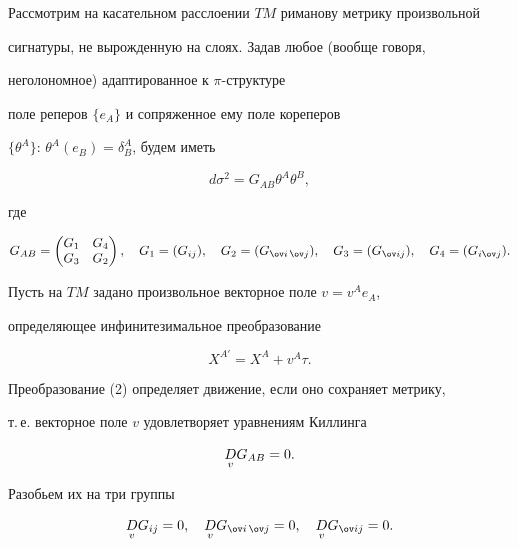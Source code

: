 Рассмотрим на касательном расслоении $TM$ риманову метрику произвольной


сигнатуры, не вырожденную на слоях. Задав любое (вообще говоря,


неголономное) адаптированное к $\pi$-структуре


поле реперов $\{e_A\}$ и сопряженное ему поле кореперов


$\{\theta^A\}$: $\theta^A(e_B)=\delta^A_B$, будем иметь


\begin{equation}


d\sigma^2=G_{AB}\theta^A\theta^B,


\end{equation}


где


$$


G_{AB}=


\begin{pmatrix}


G_1 & G_4 \\ G_3 & G_2


\end{pmatrix}


,\quad G_1=(G_{ij}),\quad G_2=(G_{\ov i\,\ov j}),\quad


G_3=(G_{\ov i j}),\quad G_4=(G_{i\ov j}).


$$


Пусть на $TM$ задано произвольное векторное поле $v=v^A e_A$,


определяющее инфинитезимальное преобразование


\begin{equation}


X^{A'}=X^A+v^A\tau.


\end{equation}


Преобразование (2) определяет движение, если оно сохраняет метрику,


т.\,е. векторное поле $v$ удовлетворяет уравнениям Киллинга


\begin{equation}


\down{v}{D}G_{AB}=0.


\end{equation}


Разобьем их на три группы


\begin{equation}


\down{v}{D}G_{ij}=0,\quad \down{v}{D}G_{\ov i\,\ov j}=0,\quad


\down{v}{D}G_{\ov i j}=0.


\end{equation}





